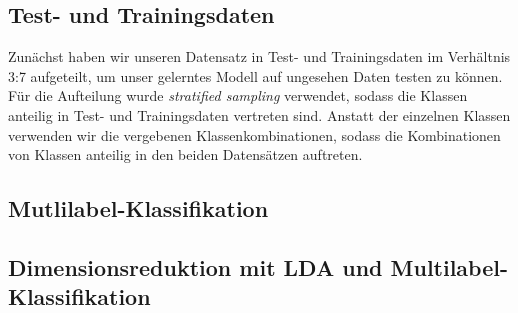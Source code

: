 \subsection{Test- und Trainingsdaten}
\label{sub:test_und_trainingsdaten}
Zunächst haben wir unseren Datensatz in Test- und Trainingsdaten im Verhältnis 3:7 aufgeteilt, um unser gelerntes Modell auf ungesehen Daten testen zu können.
Für die Aufteilung wurde \emph{stratified sampling} verwendet, sodass die Klassen anteilig in Test- und Trainingsdaten vertreten sind.
Anstatt der einzelnen Klassen verwenden wir die vergebenen Klassenkombinationen, sodass die Kombinationen von Klassen anteilig in den beiden Datensätzen auftreten.



\subsection{Mutlilabel-Klassifikation}

\subsection{Dimensionsreduktion mit LDA und Multilabel-Klassifikation}

